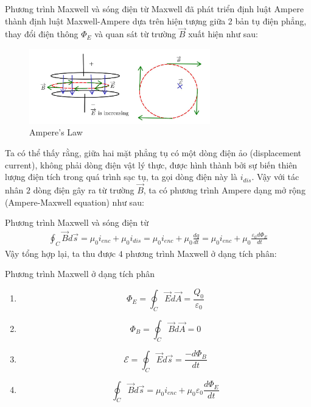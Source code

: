 \documentclass[8pt]{beamer}
\begin{document}
\begin{frame}{Phương trình Maxwell và sóng điện từ}
	Maxwell đã phát triển định luật Ampere thành định luật Maxwell-Ampere dựa trên hiện tượng giữa 2 bản tụ điện phẳng, thay đổi điện thông $\Phi_{E}$ và quan sát từ trường $\overrightarrow{B}$ xuất hiện như sau:
\begin{figure}[h]
	\includegraphics[width=0.7\textwidth]{maxwell.jpg}
			\caption{Ampere's Law}\label{fig:re9}
		\end{figure}
		Ta có thể thấy rằng, giữa hai mặt phẳng tụ có một dòng điện ảo (displacement current), không phải dòng điện vật lý thực, được hình thành bởi sự biến thiên lượng điện tích trong quá trình sạc tụ, ta gọi dòng điện này là $i_{dis}$. Vậy với tác nhân $2$ dòng điện gây ra từ trường $\overrightarrow{B}$, ta có phương trình Ampere dạng mở rộng (Ampere-Maxwell equation) như sau:
\end{frame}
\begin{frame}{Phương trình Maxwell và sóng điện từ}
\begin{equation*}
\begin{split}
	\oint_{C}\overrightarrow{B}d\overrightarrow{s}=\mu_{0} i_{enc}+\mu_{0}i_{dis}=\mu_{0}i_{enc}+\mu_{0}\frac{dq}{dt}=\mu_{0}i_{enc}+\mu_{0}\frac{\varepsilon_{0}d\Phi_{E}}{dt}
\end{split}
\end{equation*}
 Vậy tổng hợp lại, ta thu được $4$ phương trình Maxwell ở dạng tích phân:
 \begin{block}{Phương trình Maxwell ở dạng tích phân}
\begin{enumerate}
	\item $$\Phi_{E}=\oint_{C}\overrightarrow{E}d\overrightarrow{A}=\frac{Q_{0}}{\varepsilon_{0}}$$
	\item $$ \Phi_{B}=\oint_{C}\overrightarrow{B}d\overrightarrow{A}=0$$
	\item $$\mathscr{E}=\oint_{C}\overrightarrow{E}d\overrightarrow{s}=\frac{-d\Phi_{B}}{dt}$$
	\item $$\oint_{C}\overrightarrow{B}d\overrightarrow{s}=\mu_{0}i_{enc}+\mu_{0}\varepsilon_{0}\frac{d\Phi_{E}}{dt}$$
\end{enumerate}
\end{block}
\end{frame}
\end{document}
